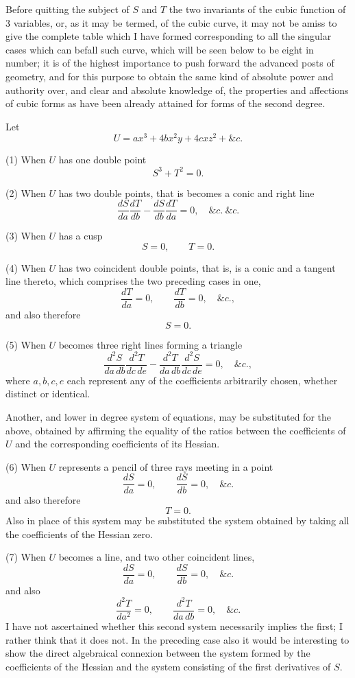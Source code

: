 \documentclass[11pt]{article}
\newcommand{\sourcepage}[1]{\marginpar{\scriptsize p.~#1}}
\begin{document}
\sourcepage{335}
Before quitting the subject of $S$ and $T$ the two invariants of the cubic function of 3 variables, or, as it may be termed, of the cubic curve, it may not be amiss to give the complete table which I have formed corresponding to all the singular cases which can befall such curve, which will be seen below to be eight in number; it is of the highest importance to push forward the advanced posts of geometry, and for this purpose to obtain the same kind of absolute power and authority over, and clear and absolute knowledge of, the properties and affections of cubic forms as have been already attained for forms of the second degree.

Let
\[
U=ax^3+4bx^2y+4cxz^2+\&c.
\]

(1) When $U$ has one double point
\[
S^3+T^2=0.
\]

(2) When $U$ has two double points, that is becomes a conic and right line
\[
\frac{dS}{da}\frac{dT}{db}-\frac{dS}{db}\frac{dT}{da}=0,\quad \&c.\ \&c.
\]

(3) When $U$ has a cusp
\[
S=0,\qquad T=0.
\]

(4) When $U$ has two coincident double points, that is, is a conic and a tangent line thereto, which comprises the two preceding cases in one,
\[
\frac{dT}{da}=0,\qquad \frac{dT}{db}=0,\quad \&c.,
\]
and also therefore
\[
S=0.
\]

(5) When $U$ becomes three right lines forming a triangle
\[
\frac{d^2S}{da\,db}\frac{d^2T}{dc\,de}
-\frac{d^2T}{da\,db}\frac{d^2S}{dc\,de}=0,\quad \&c.,
\]
where $a,b,c,e$ each represent any of the coefficients arbitrarily chosen, whether distinct or identical.

Another, and lower in degree system of equations, may be substituted for the above, obtained by affirming the equality of the ratios between the coefficients of $U$ and the corresponding coefficients of its Hessian.

(6) When $U$ represents a pencil of three rays meeting in a point
\[
\frac{dS}{da}=0,\qquad \frac{dS}{db}=0,\quad \&c.
\]
and also therefore
\[
T=0.
\]
Also in place of this system may be substituted the system obtained by taking all the coefficients of the Hessian zero.

\sourcepage{336}
(7) When $U$ becomes a line, and two other coincident lines,
\[
\frac{dS}{da}=0,\qquad \frac{dS}{db}=0,\quad \&c.
\]
and also
\[
\frac{d^2T}{da^2}=0,\qquad \frac{d^2T}{da\,db}=0,\quad \&c.
\]
I have not ascertained whether this second system necessarily implies the first; I rather think that it does not. In the preceding case also it would be interesting to show the direct algebraical connexion between the system formed by the coefficients of the Hessian and the system consisting of the first derivatives of $S$.
\end{document}

